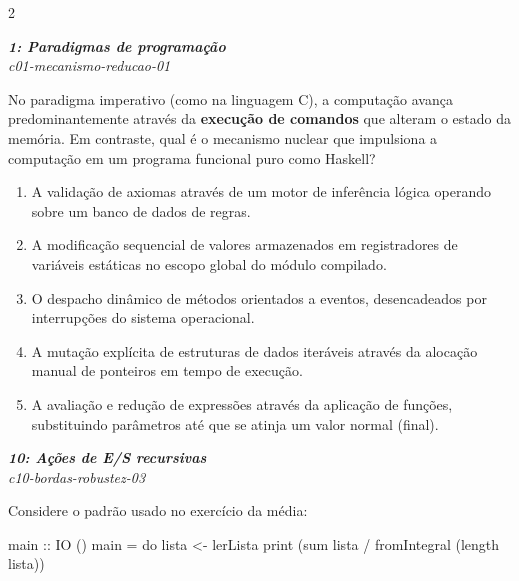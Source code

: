 \documentclass[a4paper,10pt,brazil]{article}
\begin{document}
\begin{multicols}{2}
\begin{enumerate}
\end{enumerate}

\begin{flushright}
  \footnotesize
  \textit{\textbf{1: Paradigmas de programação}}\\
  \textit{c01-mecanismo-reducao-01}\\

\end{flushright}
No paradigma imperativo (como na linguagem C), a computação avança predominantemente através da \textbf{execução de comandos} que alteram o estado da memória. Em contraste, qual é o mecanismo nuclear que impulsiona a computação em um programa funcional puro como Haskell?

\begin{enumerate}
  \item A validação de axiomas através de um motor de inferência lógica operando sobre um banco de dados de regras.

  \item A modificação sequencial de valores armazenados em registradores de variáveis estáticas no escopo global do módulo compilado.

  \item O despacho dinâmico de métodos orientados a eventos, desencadeados por interrupções do sistema operacional.

  \item A mutação explícita de estruturas de dados iteráveis através da alocação manual de ponteiros em tempo de execução.

  \item A avaliação e redução de expressões através da aplicação de funções, substituindo parâmetros até que se atinja um valor normal (final).


\end{enumerate}

\begin{flushright}
  \footnotesize
  \textit{\textbf{10: Ações de E/S recursivas}}\\
  \textit{c10-bordas-robustez-03}\\

\end{flushright}
Considere o padrão usado no exercício da média:

\begin{haskellcode}
main :: IO ()
main = do
  lista <- lerLista
  print (sum lista / fromIntegral (length lista))


\end{haskellcode}
\end{multicols}
\end{document}

